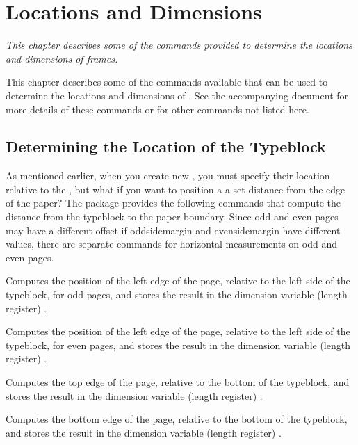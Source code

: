 \documentclass[fontsize=12pt]{scrbook}
\newcommand\chapdesc[1]{\par\emph{#1}\par}
\newcommand{\chapdesc}[1]{%
   \appenddynamiccontents*{chaphead}{\par \normalfont\emph{#1}}%
  }
\begin{document}
\chapter{Locations and Dimensions}\label{sec:locationsdims}

\chapdesc{This chapter describes some of the commands provided to
determine the locations and dimensions of frames.}

This chapter describes some of the commands available that can
be used to determine the locations and dimensions of .
See the accompanying document  for more details of 
these commands or for other commands not listed here.

\section{Determining the Location of the Typeblock}
\label{sec:typeblockloc}

As mentioned earlier, when you create new ,
you must specify their location relative to the , but
what if you want to position a  a set distance from the
edge of the paper? The  package provides the following
commands that compute the distance from the \gls*{typeblock} to the
paper boundary. Since odd and even pages may have a different offset
if \gls{oddsidemargin} and \gls{evensidemargin} have different
values, there are separate commands for horizontal measurements on odd and even pages.

Computes the position of the left edge of the page, relative 
to the left side of the \gls*{typeblock}, for odd pages, and stores the result in 
the dimension variable (length register) .

Computes the position of the left edge of the page, relative 
to the left side of the \gls*{typeblock}, for even pages, and stores the result in 
the dimension variable (length register) .

Computes the top edge of the page, relative to the bottom of the
\gls*{typeblock}, and stores the result in 
the dimension variable (length register) .

Computes the bottom edge of the page, relative to the bottom of the
\gls*{typeblock}, and stores the result in
the dimension variable (length register) .
\end{document}
